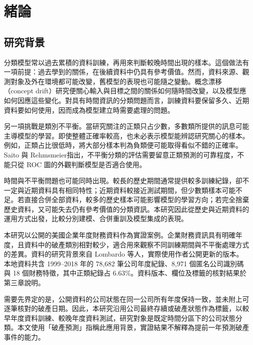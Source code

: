\chapter{緒論}\label{chap:introduction}
\begingroup
\setlength{\emergencystretch}{2em}

\section{研究背景}

分類模型常以過去累積的資料訓練，再用來判斷較晚時間出現的樣本。這個做法有一項前提：過去學到的關係，在後續資料中仍具有參考價值。然而，資料來源、觀測對象及外在環境都可能改變，舊模型的表現也可能隨之變動。概念漂移（concept drift）研究便關心輸入與目標之間的關係如何隨時間改變，以及模型應如何因應這些變化\autocite{gama2014drift}。對具有時間資訊的分類問題而言，訓練資料要保留多久、近期資料要如何使用，因而成為模型建立時需要處理的問題。

另一項挑戰是類別不平衡。當研究關注的正類只占少數，多數類所提供的訊息可能主導模型的學習。即使整體正確率較高，也未必表示模型能辨認研究關心的樣本。例如，正類占比很低時，將大部分樣本判為負類便可能取得看似不錯的正確率。Saito 與 Rehmsmeier\autocite{saito2015pr}指出，不平衡分類的評估需要留意正類預測的可靠程度，不能只從 ROC 圖的外觀判斷模型是否適合使用。

時間與不平衡問題也可能同時出現。較長的歷史期間通常提供較多訓練紀錄，卻不一定與近期資料具有相同特性；近期資料較接近測試期間，但少數類樣本可能不足。若直接合併全部資料，較多的歷史樣本可能影響模型的學習方向；若完全捨棄歷史資料，又可能失去仍有參考價值的分類資訊。本研究因此從歷史與近期資料的運用方式出發，比較分別建模、合併重訓及模型集成的表現。

本研究以公開的美國企業年度財務資料作為實證案例。企業財務資訊具有明確年度，且資料中的破產類別相對較少，適合用來觀察不同訓練期間與不平衡處理方式的差異。資料的研究背景來自 Lombardo 等人\autocite{lombardo2022bankruptcy}，實際使用作者公開更新的版本\autocite{sowide-bankruptcy-data}。本地資料共含 1999--2018 年的 78,682 筆公司年度紀錄、8,971 個匿名公司識別碼與 18 個財務特徵，其中正類紀錄占 6.63\%。資料版本、欄位及標籤的核對結果於第三章說明。

需要先界定的是，公開資料的公司狀態在同一公司所有年度保持一致，並未附上可逐筆核對的破產日期。因此，本研究沿用公司最終存續或破產狀態作為標籤，以較早年度資料訓練、較晚年度資料測試，研究對象是既定時間分區下的公司狀態分類。本文使用「破產預測」指稱此應用背景，實證結果不解釋為提前一年預測破產事件的能力。

